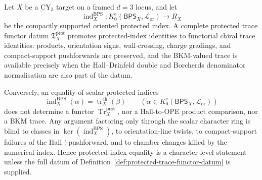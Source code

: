 \begin{theorem}
\label{thm:protected-index-vs-trace-functor}
Let \(X\) be a CY$_3$ target on a framed \(d=3\) locus, and let
\[
 \operatorname{ind}^{\mathrm{BPS}}_X\colon
 K_0^c(\mathsf{BPS}_X,\mathcal L_{\mathrm{or}})
 \longrightarrow R_X
\]
be the compactly supported oriented protected index. A complete
protected trace functor datum
\(\mathfrak T_X^{\mathrm{prot}}\) promotes protected-index identities
to functorial chiral trace identities: products, orientation signs,
wall-crossing, charge gradings, and compact-support pushforwards are
preserved, and the BKM-valued trace is available precisely when the
Hall--Drinfeld double and Borcherds denominator normalisation are also
part of the datum.

Conversely, an equality of scalar protected indices
\[
 \operatorname{ind}^{\mathrm{BPS}}_X(\alpha)
 =
 \operatorname{tr}^{\mathrm{ch}}_X(\beta)
 \qquad (\alpha\in K_0^c(\mathsf{BPS}_X,\mathcal L_{\mathrm{or}}))
\]
does not determine a functor
\(\operatorname{Tr}^{\mathrm{prot}}_X\), nor a Hall-to-OPE product
comparison, nor a BKM trace. Any argument factoring only through the
scalar character ring is blind to classes in
\(\ker(\operatorname{ind}^{\mathrm{BPS}}_X)\), to orientation-line
twists, to compact-support failures of the Hall \( ! \)-pushforward, and
to chamber changes killed by the numerical index. Hence protected-index
equality is a character-level statement unless the full datum of
Definition~\ref{def:protected-trace-functor-datum} is supplied.
\end{theorem}

